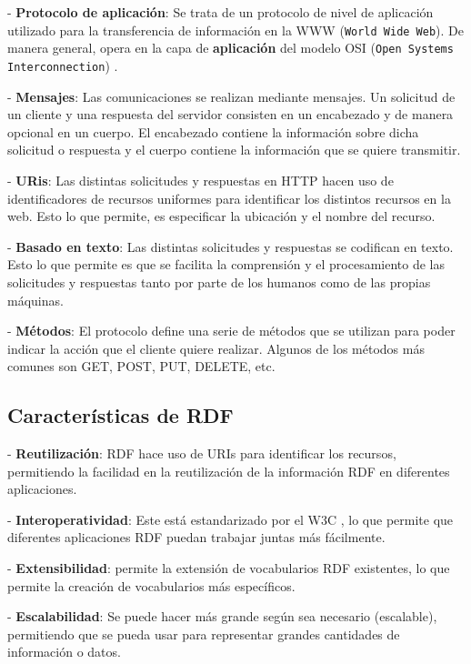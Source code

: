 \documentclass[11pt]{report}
\begin{document}
\indent \indent \indent - \textbf{Protocolo de aplicación}: Se trata de un protocolo de nivel de aplicación utilizado para la transferencia de información en la WWW (\texttt{World Wide Web}). De manera general, opera en la capa de \textbf{aplicación} del modelo OSI (\texttt{Open Systems Interconnection}) \cite{1}.

\indent \indent \indent - \textbf{Mensajes}: Las comunicaciones se realizan mediante mensajes. Un solicitud de un cliente y una respuesta del servidor consisten en un encabezado y de manera opcional en un cuerpo. El encabezado contiene la información sobre dicha solicitud o respuesta y el cuerpo contiene la información que se quiere transmitir.

\indent \indent \indent - \textbf{URis}: Las distintas solicitudes y respuestas en HTTP hacen uso de identificadores de recursos uniformes para identificar los distintos recursos en la web. Esto lo que permite, es especificar la ubicación y el nombre del recurso.

\indent \indent \indent - \textbf{Basado en texto}: Las distintas solicitudes y respuestas se codifican en texto.  Esto lo que permite es que se facilita la comprensión y el procesamiento de las solicitudes y respuestas tanto por parte de los humanos como de las propias máquinas.

\indent \indent \indent - \textbf{Métodos}: El protocolo define una serie de métodos que se utilizan para poder indicar la acción que el cliente quiere realizar. Algunos de los métodos más comunes son GET, POST, PUT, DELETE, etc.

\subsection{Características de RDF} \label{subsec:Características-RDF}

\indent \indent \indent - \textbf{Reutilización}: RDF hace uso de URIs para identificar los recursos, permitiendo la facilidad en la reutilización de la información RDF en diferentes aplicaciones.

\indent \indent \indent - \textbf{Interoperatividad}: Este está estandarizado por el W3C \cite{5}, lo que permite que diferentes aplicaciones RDF puedan trabajar juntas más fácilmente.

\indent \indent \indent - \textbf{Extensibilidad}: permite la extensión de vocabularios RDF existentes, lo que permite la creación de vocabularios más específicos.

\indent \indent \indent - \textbf{Escalabilidad}: Se puede hacer más grande según sea necesario (escalable),  permitiendo que se pueda usar para representar grandes cantidades de información o datos.
\end{document}
